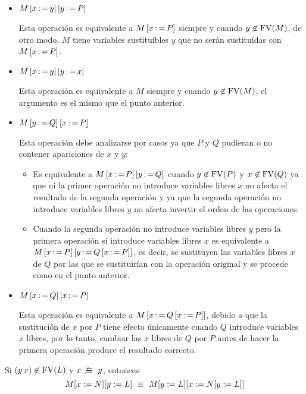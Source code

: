 \begin{itemize}
\item \( M \left[ x \operatorname{:=} y \right] \left[ y \operatorname{:=} P \right] \)
  
  Esta operación es equivalente a \( M \left[ x \operatorname{:=} P \right] \) siempre y cuando \( y\not\in \operatorname{FV}(M) \), de otro modo, \( M \) tiene variables sustituíbles \( y \) que no serán sustituídas con \( M \left[ x \operatorname{:=} P \right] \).
\item \( M \left[ x \operatorname{:=} y \right] \left[ y \operatorname{:=} x \right] \)

  Esta operación es equivalente a \( M \) siempre y cuando \( y\not\in \operatorname{FV}(M) \), el argumento es el mismo que el punto anterior.
\item \( M \left[ y \operatorname{:=} Q \right] \left[ x \operatorname{:=} P \right] \)

  Esta operación debe analizarse por casos ya que \( P \) y \( Q \) pudieran o no contener apariciones  de \( x \) y \( y \):
  \begin{itemize}
  \item Es equivalente a \( M \left[ x \operatorname{:=} P \right] \left[ y \operatorname{:=} Q \right] \) cuando \( y\not\in \operatorname{FV}(P) \) y \( x\not\in \operatorname{FV}(Q) \) ya que ni la primer operación no introduce variables libres \( x \) no afecta el resultado de la segunda operación y ya que la segunda operación no introduce variables libres \( y \) no afecta invertir el orden de las operaciones.
  \item Cuando la segunda operación no introduce variables libres \( y \) pero la primera operación si introduce variables libres \( x \) es equivalente a \( M \left[ x \operatorname{:=} P \right] \left[ y \operatorname{:=} Q \left[ x \operatorname{:=} P \right] \right] \), es decir, se sustituyen las variables libres \( x \) de \( Q \) por las que se sustituirían con la operación original y se procede como en el punto anterior.
  \end{itemize}
\item \( M \left[ x \operatorname{:=} Q \right] \left[ x \operatorname{:=} P \right] \)

  Esta operación es equivalente a \( M \left[ x \operatorname{:=} Q \left[ x \operatorname{:=} P \right] \right] \), debido a que la sustitución de \( x \) por \( P \) tiene efecto únicamente cuando \( Q \) introduce variables \( x \) libres, por lo tanto, cambiar las \( x \) libres de \( Q \) por \( P \) antes de hacer la primera operación produce el resultado correcto.
\end{itemize}

\begin{lem}
  Si \( (y\, x) \not\in \operatorname{FV}(L) \) y \( x \not\ \equiv\  y \), entonces
  \[ M[x:=N][y:=L] \ \equiv\  M[y:=L][x:=N[y:=L]] \]
\end{lem}

